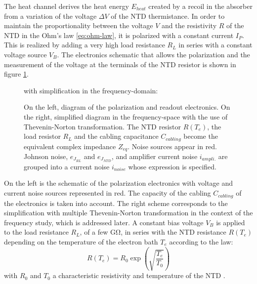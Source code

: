 The heat channel derives the heat energy $E_{heat}$ created by a recoil in the absorber from a variation of the voltage $\Delta V$ of the NTD thermistance.
In order to maintain the proportionality between the voltage $V$ and the resistivity $R$ of the NTD in the Ohm's law \ref{eq:ohm-law}, it is polarized with a constant current $I_P$.
This is realized by adding a very high load resistance $R_L$ in series with a constant voltage source $V_B$.
The electronics schematic that allows the polarization and the measurement of the voltage at the terminals of the NTD resistor is shown in figure \ref{fig:ethem-electric-scheme}.

\begin{figure}
\begin{minipage}[c]{0.45\textwidth}
\resizebox{!}{\textwidth}{%
\begin{circuitikz}[scale=1]
	
\end{circuitikz}
}%
\end{minipage}
\hfill
\vrule{}
\hfill
\begin{minipage}[c]{0.45\textwidth}
\begin{center}
with simplification in the frequency-domain:
\end{center}
\resizebox{\textwidth}{!}{%
\begin{circuitikz}
	
\end{circuitikz}
}%
\end{minipage}
\caption{On the left, diagram of the polarization and readout electronics. On the right, simplified diagram in the frequency-space with the use of Thevenin-Norton transformation. The NTD resistor $R(T_e)$, the load resistor $R_L$ and the cabling capacitance $C_{cabling}$ become the equivalent complex impedance $Z_{eq}$. Noise sources appear in red. Johnson noise, $e_{J_{RL}}$ and $e_{J_{NTD}}$, and amplifier current noise $i_{ampli.}$ are grouped into a current noise $i_{noise}$ whose expression is specified.}
\label{fig:ethem-electric-scheme}
\end{figure}

On the left is the schematic of the polarization electronics with voltage and current noise sources represented in red. The capacity of the cabling $C_{cabling}$ of the electronics is taken into account. The right scheme corresponds to the simplification with multiple Thevenin-Norton transformation \cite{Mather:1982} in the context of the frequency study, which is addressed later.
A constant bias voltage $V_B$ is applied to the load resistance $R_L$, of a few \si{\giga\ohm}, in series with the NTD resistance $R(T_e)$ depending on the temperature of the electron bath $T_e$ according to the law:
\begin{equation}
R (T_e) = R_0 \exp \left( \sqrt{ \frac{T_e}{T_0} } \right)
\end{equation}
with $R_0$ and $T_0$ a characteristic resistivity and temperature of the NTD \cite{Mathimalar:2014sfa}.

